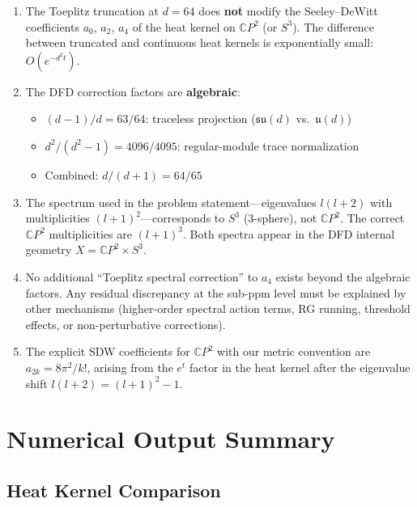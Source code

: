 \documentclass[12pt,a4paper]{article}
\begin{document}
\begin{enumerate}
\item The Toeplitz truncation at $d = 64$ does \textbf{not} modify the
  Seeley--DeWitt coefficients $a_0$, $a_2$, $a_4$ of the heat kernel on
  $\mathbb{C}P^2$ (or $S^3$).  The difference between truncated and
  continuous heat kernels is exponentially small: $O(e^{-d^2 t})$.

\item The DFD correction factors are \textbf{algebraic}:
  \begin{itemize}
  \item $(d-1)/d = 63/64$: traceless projection ($\mathfrak{su}(d)$ vs.\ $\mathfrak{u}(d)$)
  \item $d^2/(d^2-1) = 4096/4095$: regular-module trace normalization
  \item Combined: $d/(d+1) = 64/65$
  \end{itemize}

\item The spectrum used in the problem statement---eigenvalues $l(l+2)$ with
  multiplicities $(l+1)^2$---corresponds to $S^3$ (3-sphere), not
  $\mathbb{C}P^2$.  The correct $\mathbb{C}P^2$ multiplicities are
  $(l+1)^3$.  Both spectra appear in the DFD internal geometry
  $X = \mathbb{C}P^2 \times S^3$.

\item No additional ``Toeplitz spectral correction'' to $a_4$ exists beyond
  the algebraic factors.  Any residual discrepancy at the sub-ppm level
  must be explained by other mechanisms (higher-order spectral action terms,
  RG running, threshold effects, or non-perturbative corrections).

\item The explicit SDW coefficients for $\mathbb{C}P^2$ with our metric
  convention are $a_{2k} = 8\pi^2/k!$, arising from the $e^t$ factor
  in the heat kernel after the eigenvalue shift $l(l+2) = (l+1)^2 - 1$.
\end{enumerate}

\appendix
\section{Numerical Output Summary}
\label{app:numerical}

\subsection{Heat Kernel Comparison}
\end{document}
